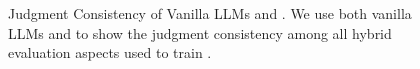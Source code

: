 \begin{figure}[t]
    \caption{Judgment Consistency of Vanilla LLMs and \method{}. We use both vanilla LLMs and \method{} to show the judgment consistency among all hybrid evaluation aspects used to train \method{}.}
    \label{fig:consjudge_vs_vanilla_consistency}
\end{figure}